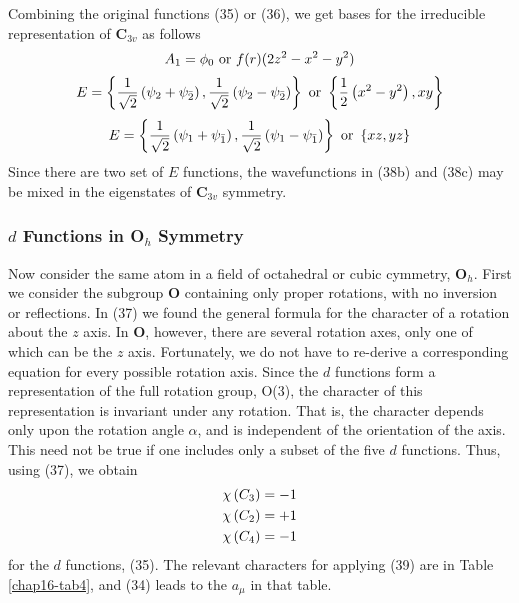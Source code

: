 \begin{figure}
\caption{}
\label{chap16-fig32}
\end{figure}

Combining the original functions (35) or (36), we get bases for the 
irreducible representation of {\bf C}$_{3v}$ as follows
\begin{equation}
A_1 = \phi_0 ~{\rm or} ~ f(r) (2z^2 - x^2 - y^2)
\label{chap16-eqno38a}
\end{equation}
\begin{equation}
E = \left\{ {1 \over \sqrt{2}} \left( \psi_2 + \psi_{\bar{2}} \right) , 
{1 \over \sqrt{2}} \left( \psi_2 - \psi_{\bar{2}} \right) \right\} ~ {\rm or} ~ 
\left\{ {1 \over 2} \left( x^2 - y^2 \right) , xy \right\}
\label{chap16-eqno38b}
\end{equation}
\begin{equation}
E = \left\{ {1 \over \sqrt{2}} \left( \psi_1 + \psi_{\bar{1}} \right) , 
{1 \over \sqrt{2}} \left( \psi_1 - \psi_{\bar{1}} \right) \right\} ~ {\rm 
or} ~ \left\{ xz , yz \right\}
\label{chap16-eqno38c}
\end{equation}
Since there are two set of $E$ functions, the wavefunctions in (38b) 
and (38c) may be mixed in the eigenstates of {\bf C}$_{3v}$ symmetry.

\subsubsection{ $d$ Functions in O$_h$ Symmetry}

Now consider the same atom in a field of octahedral or cubic 
cymmetry, {\bf O}$_h$.  First we consider the subgroup {\bf O} 
containing only proper rotations, with no inversion or reflections.  
In (37) we found the general formula for the character of a rotation 
about the $z$ axis.  In {\bf O}, however, there are several rotation 
axes, only one of which can be the $z$ axis.  Fortunately, we do not 
have to re-derive a corresponding equation for every possible 
rotation axis.  Since the $d$ functions form a representation of the 
full rotation group, O(3), the character of this representation is 
invariant under any rotation.  That is, the character depends only 
upon the rotation angle $\alpha$, and is independent of the 
orientation of the axis.  This need not be true if one includes only a 
subset of the five $d$ functions.  Thus, using (37), we obtain
\begin{eqnarray}
\chi \left( C_3 \right) = -1\cr
\chi \left( C_2 \right) = + 1\cr
\chi \left( C_4 \right) = -1
\label{chap16-eqno39}
\end{eqnarray}
for the $d$ functions, (35).  The relevant characters for applying
(39) are in Table \ref{chap16-tab4}, and (34) leads to the $a_{\mu}$
in that table.

